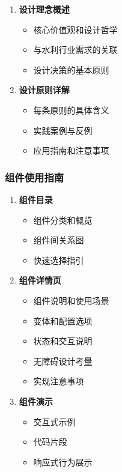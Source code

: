 \begin{enumerate}
\def\labelenumi{\arabic{enumi}.}
\tightlist
\item
  \textbf{设计理念概述}

  \begin{itemize}
  \tightlist
  \item
    核心价值观和设计哲学
  \item
    与水利行业需求的关联
  \item
    设计决策的基本原则
  \end{itemize}
\item
  \textbf{设计原则详解}

  \begin{itemize}
  \tightlist
  \item
    每条原则的具体含义
  \item
    实践案例与反例
  \item
    应用指南和注意事项
  \end{itemize}
\end{enumerate}

\subsubsection{组件使用指南}\label{ux7ec4ux4ef6ux4f7fux7528ux6307ux5357}

\begin{enumerate}
\def\labelenumi{\arabic{enumi}.}
\tightlist
\item
  \textbf{组件目录}

  \begin{itemize}
  \tightlist
  \item
    组件分类和概览
  \item
    组件间关系图
  \item
    快速选择指引
  \end{itemize}
\item
  \textbf{组件详情页}

  \begin{itemize}
  \tightlist
  \item
    组件说明和使用场景
  \item
    变体和配置选项
  \item
    状态和交互说明
  \item
    无障碍设计考量
  \item
    实现注意事项
  \end{itemize}
\item
  \textbf{组件演示}

  \begin{itemize}
  \tightlist
  \item
    交互式示例
  \item
    代码片段
  \item
    响应式行为展示
  \end{itemize}
\end{enumerate}

